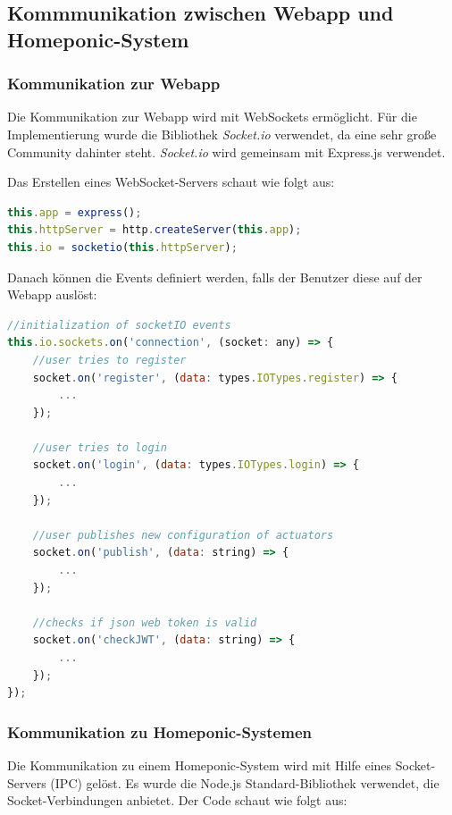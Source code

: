 \subsection{Kommmunikation zwischen Webapp und Homeponic-System}

\subsubsection{Kommunikation zur Webapp}
Die Kommunikation zur Webapp wird mit WebSockets ermöglicht. Für die Implementierung wurde die Bibliothek \textit{Socket.io} verwendet, da eine sehr große Community dahinter steht. \textit{Socket.io} wird gemeinsam mit Express.js verwendet.

Das Erstellen eines WebSocket-Servers schaut wie folgt aus:

\lstset{escapechar=?,style=customjava}
\begin{lstlisting}[language=javascript, caption=Erstellen der WebSocket-Events]
this.app = express();
this.httpServer = http.createServer(this.app);
this.io = socketio(this.httpServer);
\end{lstlisting}
\lstset{escapechar=@,style=customjava}

Danach können die Events definiert werden, falls der Benutzer diese auf der Webapp auslöst:

\lstset{escapechar=?,style=customjava}
\begin{lstlisting}[language=javascript, caption=Setzen der WebSocket-Events]
//initialization of socketIO events
this.io.sockets.on('connection', (socket: any) => {
    //user tries to register
    socket.on('register', (data: types.IOTypes.register) => {
        ...
    });

    //user tries to login
    socket.on('login', (data: types.IOTypes.login) => {
        ...
    });

    //user publishes new configuration of actuators
    socket.on('publish', (data: string) => {
        ...
    });
    
    //checks if json web token is valid
    socket.on('checkJWT', (data: string) => {
        ...
    });
});
\end{lstlisting}
\lstset{escapechar=@,style=customjava}
\clearpage
\subsubsection{Kommunikation zu Homeponic-Systemen}
Die Kommunikation zu einem Homeponic-System wird mit Hilfe eines Socket-Servers (IPC) gelöst. Es wurde die Node.js Standard-Bibliothek verwendet, die Socket-Verbindungen anbietet. Der Code schaut wie folgt aus:

